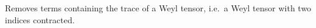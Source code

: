 
Removes terms containing
the trace of a Weyl tensor, i.e.~a Weyl tensor with two indices
contracted.

